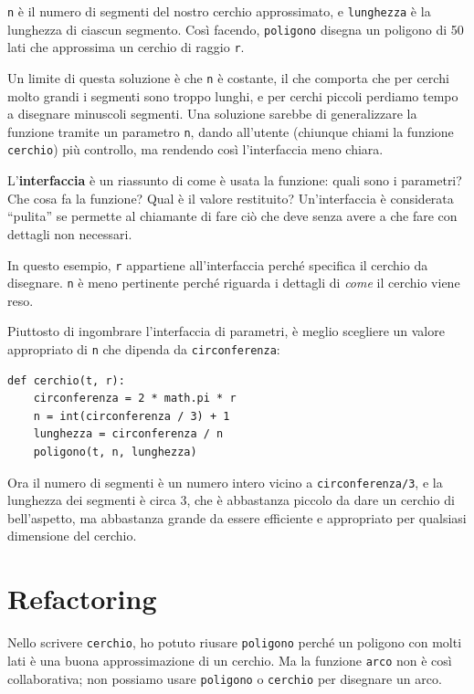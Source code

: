 \documentclass[10pt]{book}
\begin{document}
{\tt n} è il numero di segmenti del nostro cerchio approssimato, e {\tt lunghezza} è la lunghezza di ciascun segmento. Così facendo, {\tt poligono} disegna un poligono di 50 lati che approssima un cerchio di raggio {\tt r}.

Un limite di questa soluzione è che {\tt n} è costante, il che comporta che per cerchi molto grandi i segmenti sono troppo lunghi, e per cerchi piccoli perdiamo tempo a disegnare minuscoli segmenti. Una soluzione sarebbe di generalizzare la funzione tramite un parametro {\tt n}, dando all'utente (chiunque chiami la funzione {\tt cerchio}) più controllo, ma rendendo così l'interfaccia meno chiara.

L'{\bf interfaccia} è un riassunto di come è usata la funzione: quali sono i parametri? Che cosa fa la funzione? Qual è il valore restituito? Un'interfaccia è considerata ``pulita'' se permette al chiamante di fare ciò che deve senza avere a che fare con dettagli non necessari.

In questo esempio, {\tt r} appartiene all'interfaccia perché specifica il cerchio da disegnare. {\tt n} è meno pertinente perché riguarda i dettagli di {\em come} il cerchio viene reso.

Piuttosto di ingombrare l'interfaccia di parametri, è meglio scegliere un valore appropriato di {\tt n} che dipenda da {\tt circonferenza}:

\begin{verbatim}
def cerchio(t, r):
    circonferenza = 2 * math.pi * r
    n = int(circonferenza / 3) + 1
    lunghezza = circonferenza / n
    poligono(t, n, lunghezza)
\end{verbatim}
%
Ora il numero di segmenti è un numero intero vicino a {\tt circonferenza/3}, e la lunghezza dei segmenti è circa 3, che è abbastanza piccolo da dare un cerchio di bell'aspetto, ma abbastanza grande da essere efficiente e appropriato per qualsiasi dimensione del cerchio.


\section{Refactoring}
\label{refactoring}

Nello scrivere {\tt cerchio}, ho potuto riusare {\tt poligono}
perché un poligono con molti lati è una buona approssimazione di un cerchio. Ma la funzione {\tt arco} non è così collaborativa; non possiamo usare {\tt poligono}
o {\tt cerchio} per disegnare un arco.
\end{document}
